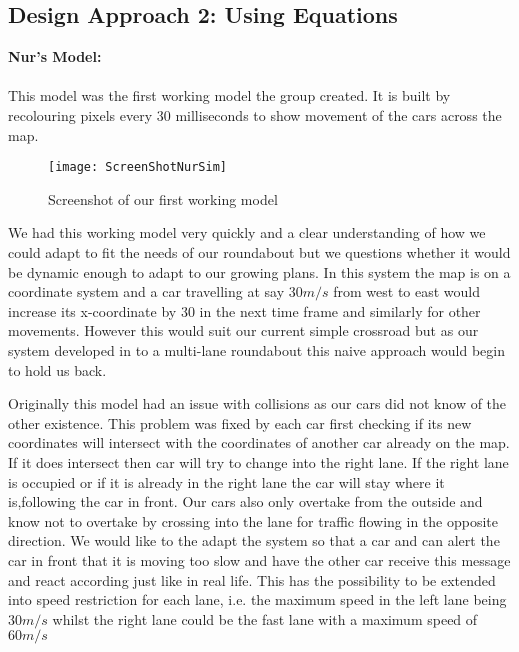 \documentclass[11pt]{article}
\begin{document}
	\subsection{Design Approach 2: Using Equations}
	
	{\bf Nur's Model:}\\\\
	This model was the first working model the group created. It is built by recolouring pixels every 30 milliseconds to show movement of the cars across the map. 
	
	\FloatBarrier
	\begin{figure}[h]
		\centering
		\texttt{[image: ScreenShotNurSim]}
		\caption{Screenshot of our first working model}
		
	\end{figure}
	
	We had this working model very quickly and a clear understanding of how we could adapt to fit the needs of our roundabout but we questions whether it would be dynamic enough to adapt to our growing plans. In this system the map is on a coordinate system and a car travelling at say $30 m/s$ from west to east would increase its x-coordinate by 30 in the next time frame and similarly for other movements. However this would suit our current simple crossroad but as our system developed in to a multi-lane roundabout this naive approach would begin to hold us back.
	
	Originally this model had an issue with collisions as our cars did not know of the other existence. This problem was fixed by each car first checking if its new coordinates will intersect with the coordinates of another car already on the map. If it does intersect then car will try to change into the right lane. If the right lane is occupied or if it is already in the right lane the car will stay where it is,following the car in front. Our cars also only overtake from the outside and know not to overtake by crossing into the lane for traffic flowing in the opposite direction. We would like to the adapt the system so that a car and can alert the car in front that it is moving too slow and have the other car receive this message and react according just like in real life. This has the possibility to be extended into speed restriction for each lane, i.e. the maximum speed in the left lane being $30m/s$ whilst the right lane could be the fast lane with a maximum speed of $60m/s$\\
	
\end{document}
